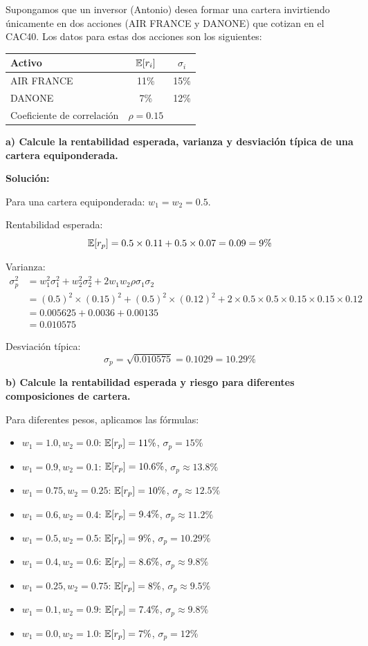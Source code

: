 \begin{ejemplo}
Supongamos que un inversor (Antonio) desea formar una cartera invirtiendo únicamente en dos acciones (AIR FRANCE y DANONE) que cotizan en el CAC40. Los datos para estas dos acciones son los siguientes:

\begin{center}
\begin{tabular}{lcc}
\toprule
Activo & $\mathbb{E}[r_i]$ & $\sigma_i$ \\
\midrule
AIR FRANCE & 11\% & 15\% \\
DANONE & 7\% & 12\% \\
Coeficiente de correlación & $\rho = 0.15$ & \\
\bottomrule
\end{tabular}
\end{center}

\textbf{a) Calcule la rentabilidad esperada, varianza y desviación típica de una cartera equiponderada.}

\textbf{Solución:}

Para una cartera equiponderada: $w_1 = w_2 = 0.5$.

Rentabilidad esperada:
$$\mathbb{E}[r_p] = 0.5 \times 0.11 + 0.5 \times 0.07 = 0.09 = 9\%$$

Varianza:
\begin{align*}
\sigma_p^2 &= w_1^2 \sigma_1^2 + w_2^2 \sigma_2^2 + 2w_1 w_2 \rho \sigma_1 \sigma_2 \\
&= (0.5)^2 \times (0.15)^2 + (0.5)^2 \times (0.12)^2 + 2 \times 0.5 \times 0.5 \times 0.15 \times 0.15 \times 0.12 \\
&= 0.005625 + 0.0036 + 0.00135 \\
&= 0.010575
\end{align*}

Desviación típica:
$$\sigma_p = \sqrt{0.010575} = 0.1029 = 10.29\%$$

\textbf{b) Calcule la rentabilidad esperada y riesgo para diferentes composiciones de cartera.}

Para diferentes pesos, aplicamos las fórmulas:
\begin{itemize}
\item $w_1 = 1.0, w_2 = 0.0$: $\mathbb{E}[r_p] = 11\%$, $\sigma_p = 15\%$
\item $w_1 = 0.9, w_2 = 0.1$: $\mathbb{E}[r_p] = 10.6\%$, $\sigma_p \approx 13.8\%$
\item $w_1 = 0.75, w_2 = 0.25$: $\mathbb{E}[r_p] = 10\%$, $\sigma_p \approx 12.5\%$
\item $w_1 = 0.6, w_2 = 0.4$: $\mathbb{E}[r_p] = 9.4\%$, $\sigma_p \approx 11.2\%$
\item $w_1 = 0.5, w_2 = 0.5$: $\mathbb{E}[r_p] = 9\%$, $\sigma_p = 10.29\%$
\item $w_1 = 0.4, w_2 = 0.6$: $\mathbb{E}[r_p] = 8.6\%$, $\sigma_p \approx 9.8\%$
\item $w_1 = 0.25, w_2 = 0.75$: $\mathbb{E}[r_p] = 8\%$, $\sigma_p \approx 9.5\%$
\item $w_1 = 0.1, w_2 = 0.9$: $\mathbb{E}[r_p] = 7.4\%$, $\sigma_p \approx 9.8\%$
\item $w_1 = 0.0, w_2 = 1.0$: $\mathbb{E}[r_p] = 7\%$, $\sigma_p = 12\%$
\end{itemize}


\end{ejemplo}
